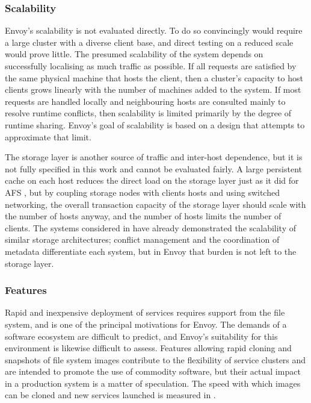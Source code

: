 \subsubsection{Scalability}

Envoy's scalability is not evaluated directly. To do so convincingly would require a large cluster with a diverse client base, and direct testing on a reduced scale would prove little. The presumed scalability of the system depends on successfully localising as much traffic as possible. If all requests are satisfied by the same physical machine that hosts the client, then a cluster's capacity to host clients grows linearly with the number of machines added to the system. If most requests are handled locally and neighbouring hosts are consulted mainly to resolve runtime conflicts, then scalability is limited primarily by the degree of runtime sharing. Envoy's goal of scalability is based on a design that attempts to approximate that limit.

The storage layer is another source of traffic and inter-host dependence, but it is not fully specified in this work and cannot be evaluated fairly. A large persistent cache on each host reduces the direct load on the storage layer just as it did for AFS \cite{satyanarayanan85}, but by coupling storage nodes with clients hosts and using switched networking, the overall transaction capacity of the storage layer should scale with the number of hosts anyway, and the number of hosts limits the number of clients. The systems considered in  have already demonstrated the scalability of similar storage architectures; conflict management and the coordination of metadata differentiate each system, but in Envoy that burden is not left to the storage layer.

\subsubsection{Features}

Rapid and inexpensive deployment of services requires support from the file system, and is one of the principal motivations for Envoy. The demands of a software ecosystem are difficult to predict, and Envoy's suitability for this environment is likewise difficult to assess. Features allowing rapid cloning and snapshots of file system images contribute to the flexibility of service clusters and are intended to promote the use of commodity software, but their actual impact in a production system is a matter of speculation. The speed with which images can be cloned and new services launched is measured in .

